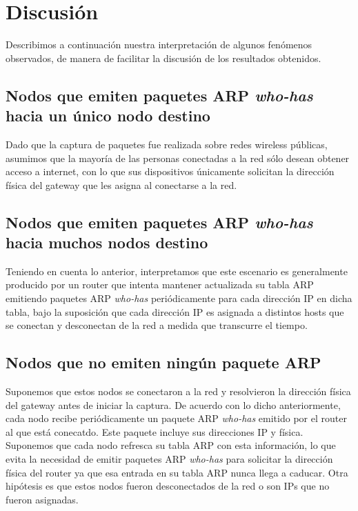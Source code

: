 \documentclass[10pt, a4paper]{article}
\begin{document}
\newpage
\section{Discusión}
Describimos a continuación nuestra interpretación de algunos fenómenos observados, de manera de facilitar la discusión de los resultados obtenidos.

\subsection{Nodos que emiten paquetes ARP \textit{who-has} hacia un único nodo destino}

Dado que la captura de paquetes fue realizada sobre redes wireless públicas, asumimos que la mayoría de las personas conectadas a la red sólo desean obtener acceso a internet, con lo que sus dispositivos únicamente solicitan la dirección física del gateway que les asigna al conectarse a la red.


\subsection{Nodos que emiten paquetes ARP \textit{who-has} hacia muchos nodos destino}

Teniendo en cuenta lo anterior, interpretamos que este escenario es generalmente producido por un router que intenta mantener actualizada su tabla ARP emitiendo paquetes ARP \textit{who-has} periódicamente para cada dirección IP en dicha tabla, bajo la suposición que cada dirección IP es asignada a distintos hosts que se conectan y desconectan de la red a medida que transcurre el tiempo.


\subsection{Nodos que no emiten ningún paquete ARP}

Suponemos que estos nodos se conectaron a la red y resolvieron la dirección física del gateway antes de iniciar la captura. De acuerdo con lo dicho anteriormente, cada nodo recibe periódicamente un paquete ARP \textit{who-has} emitido por el router al que está conecatdo. Este paquete incluye sus direcciones IP y física. Suponemos que cada nodo refresca su tabla ARP con esta información, lo que evita la necesidad de emitir paquetes ARP \textit{who-has} para solicitar la dirección física del router ya que esa entrada en su tabla ARP nunca llega a caducar.
Otra hipótesis es que estos nodos fueron desconectados de la red o son IPs que no fueron asignadas.
\end{document}
